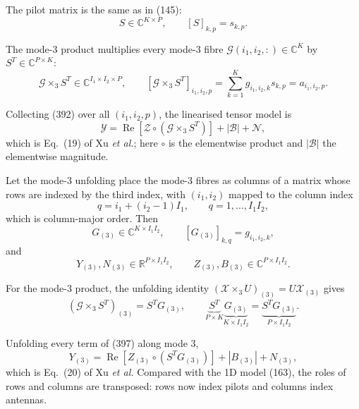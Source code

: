 \documentclass[12pt,a4paper]{article}
\begin{document}
The pilot matrix is the same as in (145):
\begin{equation}
S\in\mathbb C^{K\times P},
\qquad
[S]_{k,p}=s_{k,p}.
\tag{395}
\end{equation}

The mode-3 product multiplies every mode-3 fibre
$\mathcal G(i_1,i_2,:)\in\mathbb C^{K}$ by $S^T\in\mathbb C^{P\times K}$:
\begin{equation}
\mathcal G\times_3 S^T
\in
\mathbb C^{I_1\times I_2\times P},
\qquad
[\mathcal G\times_3 S^T]_{i_1,i_2,p}
=\sum_{k=1}^{K}g_{i_1,i_2,k}s_{k,p}
=a_{i_1,i_2,p}.
\tag{396}
\end{equation}

Collecting (392) over all $(i_1,i_2,p)$, the linearised tensor model is
\begin{equation}
\boxed{
\mathcal Y
=
\operatorname{Re}\!\left[
\mathcal Z\circ
(\mathcal G\times_3 S^T)
\right]
+|\mathcal B|
+\mathcal N,
}
\tag{397}
\end{equation}
which is Eq.~(19) of Xu \emph{et al.}; here $\circ$ is the elementwise
product and $|\mathcal B|$ the elementwise magnitude.

Let the mode-3 unfolding place the mode-3 fibres as columns of a matrix
whose rows are indexed by the third index, with $(i_1,i_2)$ mapped to
the column index
\begin{equation}
q=i_1+(i_2-1)I_1,
\qquad
q=1,\ldots,I_1I_2,
\tag{398}
\end{equation}
which is column-major order. Then
\begin{equation}
G_{(3)}\in\mathbb C^{K\times I_1I_2},
\qquad
[G_{(3)}]_{k,q}=g_{i_1,i_2,k},
\tag{398a}
\end{equation}
and
\begin{equation}
Y_{(3)},N_{(3)}\in\mathbb R^{P\times I_1I_2},
\qquad
Z_{(3)},B_{(3)}\in\mathbb C^{P\times I_1I_2}.
\tag{399}
\end{equation}

For the mode-3 product, the unfolding identity
$(\mathcal X\times_3 U)_{(3)}=U\mathcal X_{(3)}$ gives
\begin{equation}
\boxed{
(\mathcal G\times_3 S^T)_{(3)}
=
S^T G_{(3)},
\qquad
\underbrace{S^T}_{P\times K}
\underbrace{G_{(3)}}_{K\times I_1I_2}
=
\underbrace{S^TG_{(3)}}_{P\times I_1I_2}.
}
\tag{400}
\end{equation}

Unfolding every term of (397) along mode 3,
\begin{equation}
\boxed{
Y_{(3)}
=
\operatorname{Re}\!\left[
Z_{(3)}\circ(S^T G_{(3)})
\right]
+|B_{(3)}|
+N_{(3)},
}
\tag{401}
\end{equation}
which is Eq.~(20) of Xu \emph{et al.} Compared with the 1D model
(163), the roles of rows and columns are transposed: rows now index
pilots and columns index antennas.
\end{document}
